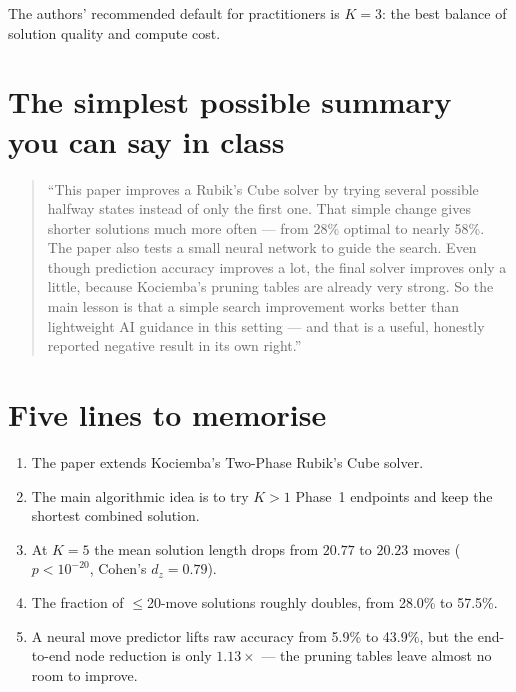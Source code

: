 \documentclass[11pt,a4paper]{article}
\begin{document}
The authors' recommended default for practitioners is $K=3$: the best
balance of solution quality and compute cost.

\section{The simplest possible summary you can say in class}
\label{sec:summary}

\begin{quote}
``This paper improves a Rubik's Cube solver by trying several possible
halfway states instead of only the first one. That simple change gives
shorter solutions much more often --- from 28\% optimal to nearly 58\%.
The paper also tests a small neural network to guide the search. Even
though prediction accuracy improves a lot, the final solver improves
only a little, because Kociemba's pruning tables are already very
strong. So the main lesson is that a simple search improvement works
better than lightweight AI guidance in this setting --- and that is a
useful, honestly reported negative result in its own right.''
\end{quote}

\section{Five lines to memorise}

\begin{enumerate}[leftmargin=2em]
  \item The paper extends Kociemba's Two-Phase Rubik's Cube solver.
  \item The main algorithmic idea is to try $K > 1$ Phase~1 endpoints and
        keep the shortest combined solution.
  \item At $K=5$ the mean solution length drops from $20.77$ to
        $20.23$ moves ($p < 10^{-20}$, Cohen's $d_z = 0.79$).
  \item The fraction of $\leq$20-move solutions roughly doubles, from
        28.0\% to 57.5\%.
  \item A neural move predictor lifts raw accuracy from 5.9\% to
        43.9\%, but the end-to-end node reduction is only $1.13\times$
        --- the pruning tables leave almost no room to improve.
\end{enumerate}
\end{document}

